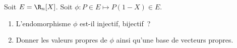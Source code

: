 \begin{enonce}
\begin{exercise}[ID={RMS124 E646 Mines-Ponts PSI},subtitle={},tags={}, difficulty={0}]
Soit $E=\R_n[X]$.
Soit $\phi : P\in E\mapsto P(1-X) \in E$.
\begin{enumerate}
  \item L'endomorphisme $\phi$ est-il injectif, bijectif~?
  \item Donner les valeurs propres de $\phi$ ainsi qu'une base de vecteurs propres.
\end{enumerate}
\end{exercise}
\begin{solution}
\end{solution}
\end{enonce}
